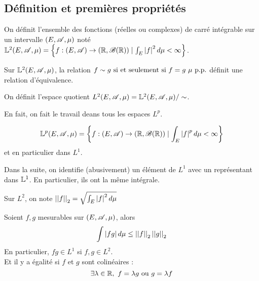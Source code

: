 \subsection{Définition et premières propriétés}

\begin{definition}
	On définit l'ensemble des fonctions (réelles ou complexes) de carré intégrable sur un intervalle $(E, \mathscr{A}, \mu)$ noté
	$\mathbb{L}^2 (E, \mathscr{A}, \mu) = \left\{ f: (E, \mathscr{A}) \to (\mathbb{R}, \mathscr{B}(\mathbb{R})) \mid \int_E \left|f\right|^2 d \mu < \infty \right\}$.
\end{definition}


\begin{prop}
	Sur $\mathbb{L}^2 (E, \mathscr{A}, \mu)$, la relation $f \sim g \text{ si et seulement si } f = g \ \mu \text{ p.p.}$ définit une relation d'équivalence.
\end{prop}

\begin{definition}
	On définit l'espace quotient $L^2(E, \mathscr{A}, \mu) = \mathbb{L}^2 (E, \mathscr{A}, \mu) / \sim$.
\end{definition}

\begin{remarque}
	En fait, on fait le travail deans tous les espaces $L^p$.

	$$ \mathbb{L}^p (E, \mathscr{A}, \mu) = \left\{ f: (E, \mathscr{A}) \to (\mathbb{R}, \mathscr{B}(\mathbb{R})) \mid \int_E \left|f\right|^p d \mu < \infty \right\}$$
	et en particulier dans $L^1$.
\end{remarque}

\begin{remarque}
	Dans la suite, on identifie (abusivement) un élément de $L^1$ avec un représentant dans $\mathbb{L}^1$.
	En particulier, ils ont la même intégrale.

	Sur $L^2$, on note $\left|\left|f\right|\right|_2 = \sqrt{\int_E \left|f\right|^2 d \mu}$
\end{remarque}


\begin{theorem}
	Soient $f, g$ mesurables sur $(E, \mathscr{A}, \mu)$, alors
	$$\int \left|fg\right| d \mu \leq \left|\left|f\right|\right|_2 \left|\left|g\right|\right|_2$$
	En particulier, $fg \in L^1$ si $f, g \in L^2$.\\
	Et il y a égalité si  $f$ et $g$ sont colinéaires :
	$$\exists \lambda \in \mathbb{R}, \ f = \lambda g \text{ ou } g = \lambda f$$
\end{theorem}

